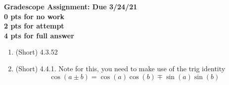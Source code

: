 \documentclass[a4paper,11pt]{article}
\begin{document}
\begin{center}
{\bf Gradescope Assignment: Due 3/24/21\\
0 pts for no work\\ 2 pts for attempt\\ 4 pts for full answer}
\end{center}

\begin{enumerate}
\item (Short) 4.3.52
\item (Short) 4.4.1.  Note for this, you need to make use of the trig identity
\[
\cos(a\pm b) = \cos(a)\cos(b)\mp \sin(a)\sin(b)
\]
\end{enumerate}
\end{document}
